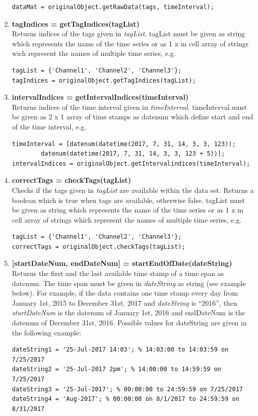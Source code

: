 \documentclass[a4]{scrreprt}
\begin{document}
\begin{enumerate}
\begin{lstlisting}[frame=single]
dataMat = originalObject.getRawData(tags, timeInterval);
	\end{lstlisting}
\item \textbf{tagIndices = getTagIndices(tagList)}\\
	Returns indices of the tags given in \textit{tagList}. tagList must be given as string which represents the name of the time series or as 1 x m cell array of strings wich represent the names of multiple time series, e.g.
	\begin{lstlisting}[frame=single]
tagList = {'Channel1', 'Channel2', 'Channel3'};
tagIndices = originalObject.getTagIndices(tagList);
	\end{lstlisting}
\item \textbf{intervalIndices = getIntervalIndices(timeInterval)}\\
	Returns indices of the time interval given in \textit{timeInterval}. timeInterval must be given as 2 x 1 array of time stamps as datenum which define start and end of the time interval, e.g.
	\begin{lstlisting}[frame=single]
timeInterval = [datenum(datetime(2017, 7, 31, 14, 3, 3, 123));
		datenum(datetime(2017, 7, 31, 14, 3, 3, 123 + 5))];
intervalIndices = originalObject.getIntervalindices(timeInterval);
	\end{lstlisting}
\item \textbf{correctTags = checkTags(tagList)}\\
	Checks if the tags given in \textit{tagList} are available within the data set. Returns a boolean which is true when tags are available, otherwise false. tagList must be given as string which represents the name of the time series or as 1 x m cell array of strings which represent the names of multiple time series, e.g.
	\begin{lstlisting}[frame=single]
tagList = {'Channel1', 'Channel2', 'Channel3'};
correctTags = originalObject.checkTags(tagList);
	\end{lstlisting}
\item \textbf{[startDateNum, endDateNum] = startEndOfDate(dateString)}\\
	Returns the first and the last available time stamp of a time span as datenum. The time span must be given in \textit{dateString} as string (see example below). For example, if the data contains one time stamp every day from January 1st, 2015 to December 31st, 2017 and \textit{dateString} is ``2016'', then \textit{startDateNum} is the datenum of January 1st, 2016 and endDateNum is the datenum of December 31st, 2016. Possible values for dateString are given in the following example:
	\begin{lstlisting}[frame=single]
dateString1 = '25-Jul-2017 14:03'; % 14:03:00 to 14:03:59 on 7/25/2017
dateString2 = '25-Jul-2017 2pm'; % 14:00:00 to 14:59:59 on 7/25/2017
dateString3 = '25-Jul-2017'; % 00:00:00 to 24:59:59 on 7/25/2017
dateString4 = 'Aug-2017'; % 00:00:00 on 8/1/2017 to 24:59:59 on 8/31/2017


\end{lstlisting}
\end{enumerate}
\end{document}
